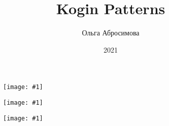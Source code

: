 \documentclass[12pt,twoside,openany,b5paper]{book}
\newcommand{\figp}[1]{
  \begin{figure}
  \begin{center}
  \texttt{[image: \#1]}
  \end{center}
  \end{figure}
}
\begin{document}
\title{Kogin Patterns}
\author{Ольга Абросимова}
\date{2021}
\maketitle

\figp{1}

\figp{2}

\figp{3}
\end{document}
